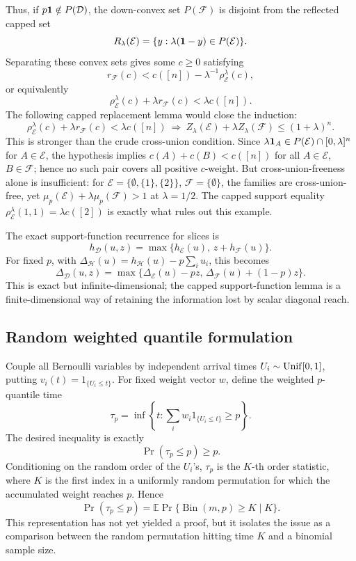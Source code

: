 \documentclass[12pt]{article}
\begin{document}
Thus, if \(p{\bf1}\notin P(\mathcal D)\), the down-convex set
\(P(\mathcal F)\) is disjoint from the reflected capped set
\[
  R_\lambda(\mathcal E)=\{y:\lambda({\bf1}-y)\in P(\mathcal E)\}.
\]
Separating these convex sets gives some \(c\ge0\) satisfying
\[
  r_{\mathcal F}(c)
  <
  c([n])-\lambda^{-1}\rho^\lambda_{\mathcal E}(c),
\]
or equivalently
\[
  \rho^\lambda_{\mathcal E}(c)+\lambda r_{\mathcal F}(c)
  <\lambda c([n]).
\]
The following capped replacement lemma would close the induction:
\[
\boxed{\quad
  \rho^\lambda_{\mathcal E}(c)+\lambda r_{\mathcal F}(c)
  <\lambda c([n])
  \ \Longrightarrow\
  Z_\lambda(\mathcal E)+\lambda Z_\lambda(\mathcal F)\le(1+\lambda)^n .
  \quad}
\]
This is stronger than the crude cross-union condition.  Since
\(\lambda{\bf1}_A\in P(\mathcal E)\cap[0,\lambda]^n\) for \(A\in\mathcal E\),
the hypothesis implies \(c(A)+c(B)<c([n])\) for all
\(A\in\mathcal E\), \(B\in\mathcal F\); hence no such pair covers all positive
\(c\)-weight.  But cross-union-freeness alone is insufficient: for
\(\mathcal E=\{\emptyset,\{1\},\{2\}\}\), \(\mathcal F=\{\emptyset\}\), the
families are cross-union-free, yet
\(\mu_p(\mathcal E)+\lambda\mu_p(\mathcal F)>1\) at \(\lambda=1/2\).  The
capped support equality \(\rho^\lambda_{\mathcal E}(1,1)=\lambda c([2])\) is
exactly what rules out this example.

The exact support-function recurrence for slices is
\[
  h_{\mathcal D}(u,z)=\max\{h_{\mathcal E}(u),\,z+h_{\mathcal F}(u)\}.
\]
For fixed \(p\), with
\(\Delta_{\mathcal H}(u)=h_{\mathcal H}(u)-p\sum_i u_i\), this becomes
\[
  \Delta_{\mathcal D}(u,z)
   =\max\{\Delta_{\mathcal E}(u)-pz,\,
           \Delta_{\mathcal F}(u)+(1-p)z\}.
\]
This is exact but infinite-dimensional; the capped support-function lemma is a
finite-dimensional way of retaining the information lost by scalar diagonal
reach.

\subsection*{Random weighted quantile formulation}

Couple all Bernoulli variables by independent arrival times \(U_i\sim
{\rm Unif}[0,1]\), putting \(v_i(t)=1_{\{U_i\le t\}}\).  For fixed weight vector
\(w\), define the weighted \(p\)-quantile time
\[
  \tau_p=\inf\left\{t:\sum_i w_i 1_{\{U_i\le t\}}\ge p\right\}.
\]
The desired inequality is exactly
\[
  \Pr(\tau_p\le p)\ge p.
\]
Conditioning on the random order of the \(U_i\)'s, \(\tau_p\) is the \(K\)-th
order statistic, where \(K\) is the first index in a uniformly random
permutation for which the accumulated weight reaches \(p\).  Hence
\[
  \Pr(\tau_p\le p)=
  \mathbb E\Pr\{\operatorname{Bin}(m,p)\ge K\mid K\}.
\]
This representation has not yet yielded a proof, but it isolates the issue as a
comparison between the random permutation hitting time \(K\) and a binomial
sample size.
\end{document}
